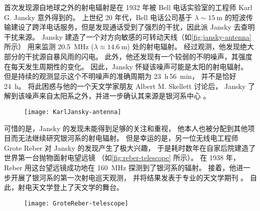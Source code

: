 首次发现源自地球之外的射电辐射是在 1932 年被 Bell 电话实验室的工程师
Karl G. Jansky 意外得到的。
上世纪 20 年代，Bell 电话公司基于 $\lambda \sim \SI{15}{\meter}$
的短波传输建设了跨洋电话服务，但是发现通话受到了强烈的干扰，因此派 Jansky 去查明干扰来源。
Jansky 建造了一个对方向敏感的可转动天线（如\autoref{fig:jansky-antenna} 所示）
用来监测 \SI{20.5}{\MHz} ($\lambda \approx \SI{14.6}{\meter}$) 处的射电辐射。
经过观测，他发现绝大部分的干扰源自暴风雨的闪电。
此外，他还发现有一个较弱的不明噪声，其强度在每天发生周期性的变化。
因此，Jansky 怀疑该噪声可能是太阳的射电辐射。
但是持续的观测显示这个不明噪声的准确周期为 \SI{23}{\hour}\,\SI{56}{\minute}，
并不是恰好 \SI{24}{\hour}。
将此困惑与他的一个天文学家朋友 Albert M. Skellett 讨论后，
Jansky 了解到该噪声来自太阳系之外，并进一步确认其来源是银河系中心 \cite{jansky1933}。

\begin{figure}[htp]
  \centering
  \texttt{[image: KarlJansky-antenna]}
  \label{fig:jansky-antenna}
\end{figure}

可惜的是，Jansky 的发现未能得到足够的关注和重视，
他本人也被分配到其他项目而无法继续研究银河系的射电辐射。
但是幸运的是，另一位无线电工程师 Grote Reber 对 Jansky 的发现产生了极大兴趣，
于是耗时数年在自家后院建造了世界第一台抛物面射电望远镜
（如\autoref{fig:reber-telescope} 所示）。
在 1938 年，Reber 用这台望远镜成功地在 \SI{160}{\MHz} 探测到了银河系的辐射。
接着，他进一步开展了银河系的第一次射电巡天观测，
并将结果发表于专业的天文学期刊 \apj \cite{reber1940}。
自此，射电天文学登上了天文学的舞台。

\begin{figure}[htp]
  \centering
  \texttt{[image: GroteReber-telescope]}
  \label{fig:reber-telescope}
\end{figure}

